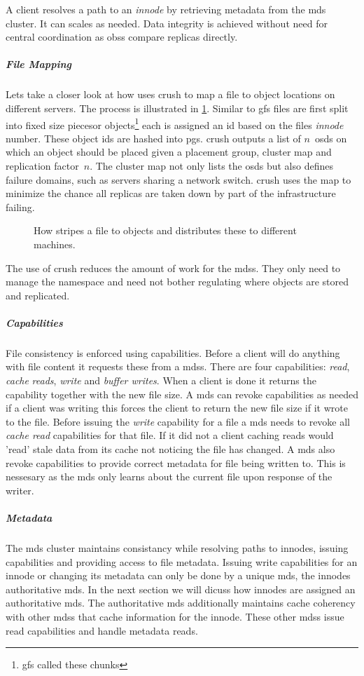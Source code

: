 A client resolves a path to an \textit{innode} by retrieving metadata from the \ac{mds} cluster. It can scales as needed. Data integrity is achieved without need for central coordination as \acp{obs} compare replicas directly. 
%
\subparagraph{File Mapping}
Lets take a closer look at how \ceph{} uses \ac{crush} to map a file to object locations on different servers. The process is illustrated in \cref{fig:ceph_crush}. Similar to \ac{gfs} files are first split into fixed size piecesor objects\footnote{\ac{gfs} called these chunks} each is assigned an id based on the files \textit{innode} number. These object ids are hashed into \acp{pg}. \ac{crush} outputs a list of $n$~\acp{osd} on which an object should be placed given a placement group, cluster map and replication factor~$n$. The cluster map not only lists the \acp{osd} but also defines failure domains, such as servers sharing a network switch. \ac{crush} uses the map to minimize the chance all replicas are taken down by part of the infrastructure failing.

\begin{figure}[htbp]
	\centering
	
	\caption{How \ceph{} stripes a file to objects and distributes these to different machines.}
	\label{fig:ceph_crush}
\end{figure}

The use of \ac{crush} reduces the amount of work for the \acp{mds}. They only need to manage the namespace and need not bother regulating where objects are stored and replicated.
%
\subparagraph{Capabilities}
File consistency is enforced using capabilities. Before a client will do anything with file content it requests these from a \acp{mds}. There are four capabilities: \textit{read}, \textit{cache} \textit{reads}, \textit{write} and \textit{buffer writes}. When a client is done it returns the capability together with the new file size. A \ac{mds} can revoke capabilities as needed if a client was writing this forces the client to return the new file size if it wrote to the file. Before issuing the \textit{write} capability for a file a \ac{mds} needs to revoke all \textit{cache read} capabilities for that file. If it did not a client caching reads would 'read' stale data from its cache not noticing the file has changed. A \ac{mds} also revoke capabilities to provide correct metadata for file being written to. This is nessesary as the \ac{mds} only learns about the current file upon response of the writer.
%
\subparagraph{Metadata}
The \ac{mds} cluster maintains consistancy while resolving paths to innodes, issuing capabilities and providing access to file metadata. Issuing write capabilities for an innode or changing its metadata can only be done  by a unique \ac{mds}, the innodes authoritative \ac{mds}. In the next section we will dicuss how innodes are assigned an authoritative \ac{mds}. The authoritative \ac{mds} additionally maintains cache coherency with other \acp{mds} that cache information for the innode. These other \acp{mds} issue read capabilities and handle metadata reads.

